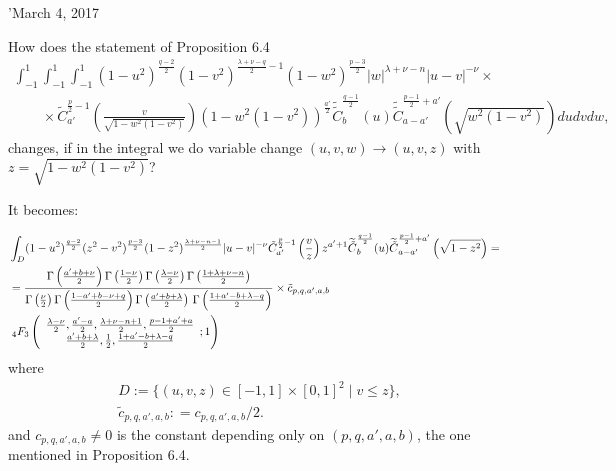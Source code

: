 \documentclass{article}
\newcommand{\assign}{:=}
\begin{document}
'March 4, 2017

\begin{question}
  \label{q1}How does the statement of Proposition 6.4
  \[ \begin{array}{l}
       \int_{- 1}^1 \int_{- 1}^1 \int_{- 1}^1 (1 - u^2)^{\frac{q - 2}{2}} (1 -
       v^2)^{\frac{\lambda + \nu - q}{2} - 1} (1 - w^2)^{\frac{p - 3}{2}} | w
       |^{\lambda + \nu - n} | u - v |^{- \nu} \times\\
       \qquad \times \tilde{C}^{\frac{p}{2} - 1}_{a'} \left( \frac{v}{\sqrt{1
       - w^2 (1 - v^2)}} \right) (1 - w^2 (1 - v^2))^{\frac{a'}{2}}
       \widetilde{\tilde{C}}^{\frac{q - 1}{2}}_b (u)
       \widetilde{\tilde{C}}^{\frac{p - 1}{2} + a'}_{a - a'} \left( \sqrt{w^2
       (1 - v^2)} \right) d u d v d w,
     \end{array} \]
  changes, if in the integral we do variable change $(u, v, w) \rightarrow (u,
  v, z)$ with $z = \sqrt{1 - w^2 (1 - v^2)}$?
\end{question}

\begin{answer}
  It becomes: 
\end{answer}
\begin{eqnarray}
  & \int_D (1 - u^2)^{\frac{q - 2}{2}} (z^2 - v^2)^{\frac{p - 3}{2}} (1 -
  z^2)^{\frac{\lambda + \nu - n - 1}{2}} | u - v |^{- \nu}
  \tilde{C}^{\frac{p}{2} - 1}_{a'} \left( \frac{v}{z} \right) z^{a' + 1}
  \widetilde{\tilde{C}}^{\frac{q - 1}{2}}_b (u) \widetilde{\tilde{C}}^{\frac{p
  - 1}{2} + a'}_{a - a'} \left( \sqrt{1 - z^2} \right) = &  \nonumber\\
  & = \frac{\Gamma \left( \frac{a' + b + \nu}{2} \right) \Gamma \left(
  \frac{1 - \nu}{2} \right) \Gamma \left( \frac{\lambda - \nu}{2} \right)
  \Gamma \left( \frac{1 + \lambda + \nu - n}{2} \right)}{\Gamma \left(
  \frac{\nu}{2} \right) \Gamma \left( \frac{1 - a' + b - \nu + q}{2} \right)
  \Gamma \left( \frac{a' + b + \lambda}{2} \right)  \hspace{0.17em} \Gamma
  \left( \frac{1 + a' - b + \lambda - q}{2} \right)} \times \tilde{c}_{p, q,
  a', a, b} &  \nonumber\\
  & \;_4 F_3 \left( \begin{array}{c}
    \frac{\lambda - \nu}{2}, \frac{a' - a}{2}, \frac{\lambda + \nu - n +
    1}{2}, \frac{p - 1 + a' + a}{2}\\
    \frac{a' + b + \lambda}{2}, \frac{1}{2}, \frac{1 + a' - b + \lambda -
    q}{2}
  \end{array} ; 1 \right) &  \nonumber
\end{eqnarray}
where
\begin{eqnarray}
  & D \assign \{ (u, v, z) \in [- 1, 1] \times [0, 1]^2 \mid v \leqslant z
  \}, &  \nonumber\\
  & \tilde{c}_{p, q, a', a, b} : = c_{p, q, a', a, b} / 2. &  \nonumber
\end{eqnarray}
and $c_{p, q, a', a, b} \neq 0$ is the constant depending only on $(p, q, a',
a, b)$, the one mentioned in Proposition 6.4.
\end{document}
